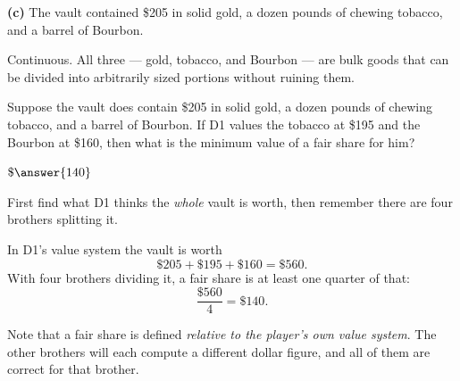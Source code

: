 \documentclass[12pt]{ximera}
\begin{document}
\begin{problem}
\begin{prompt}
\textbf{(c)} The vault contained \$205 in solid gold, a dozen pounds of chewing
tobacco, and a barrel of Bourbon.

\begin{multipleChoice}
\end{multipleChoice}

\begin{solution}
Continuous. All three --- gold, tobacco, and Bourbon --- are bulk goods that can be
divided into arbitrarily sized portions without ruining them.
\end{solution}
\end{prompt}
\end{problem}

\begin{problem}
Suppose the vault does contain \$205 in solid gold, a dozen pounds of chewing tobacco,
and a barrel of Bourbon. If D1 values the tobacco at \$195 and the Bourbon at \$160,
then what is the minimum value of a fair share for him?

$\$\answer{140}$

\begin{hint}
First find what D1 thinks the \emph{whole} vault is worth, then remember there are
four brothers splitting it.
\end{hint}

\begin{solution}
In D1's value system the vault is worth
\[ \$205 + \$195 + \$160 = \$560. \]
With four brothers dividing it, a fair share is at least one quarter of that:
\[ \frac{\$560}{4} = \$140. \]

Note that a fair share is defined \emph{relative to the player's own value system}.
The other brothers will each compute a different dollar figure, and all of them are
correct for that brother.
\end{solution}
\end{problem}
\end{document}
